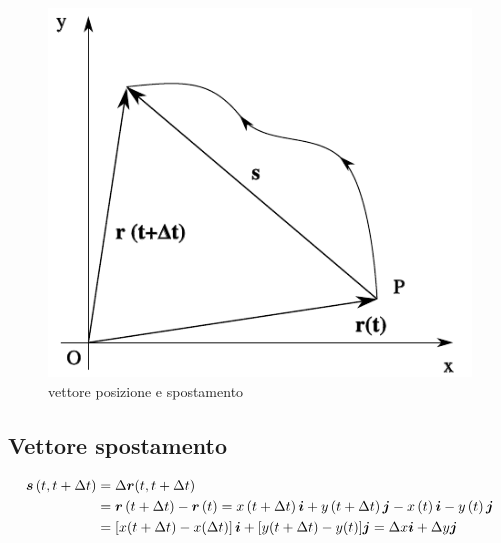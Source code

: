 \begin{figure}[htbp]
\centering
\includegraphics[scale=0.7]{immagini/fisica1/vettore_posizione}
\caption{vettore posizione e spostamento}
\end{figure}
\subsection{Vettore spostamento}
\parbox[c]{\textwidth}{
\begin{align*}
\boldsymbol{s}\left(t,t+\Delta t\right)&=\Delta \boldsymbol{r}(t,t+\Delta t)\\
&=\boldsymbol{r}\left(t+\Delta t\right)-\boldsymbol{r}\left(t\right)=x\left(t+\Delta t\right)\boldsymbol{i}+y\left(t+\Delta t\right)\boldsymbol{j}-x\left(t\right)\boldsymbol{i}-y\left(t\right)\boldsymbol{j}\\
&=\left[x(t+\Delta t)-x(\Delta t)\right]\boldsymbol{i}+[y(t+\Delta t)-y(t)]\boldsymbol{j}=\Delta x\boldsymbol{i}+\Delta y \boldsymbol{j}
\end{align*}
}
